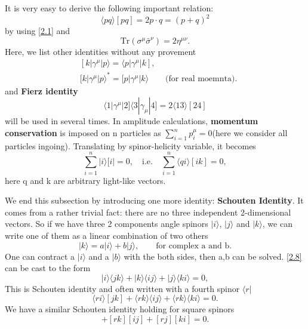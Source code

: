 \documentclass[12pt]{article}
\numberwithin{equation}{section}
\newcommand{\mdavg}[2]{\langle #1 \rangle\!\langle #2 \rangle}
\newcommand{\avg}[1]{\langle #1 \rangle}
\newcommand{\aket}[1]{|#1\rangle}
\newcommand{\cbrak}[2]{\avg{#1}\![#2]}
\begin{document}
It is very easy to derive the following important relation:
\begin{equation}
    \cbrak{pq}{pq}=2p\cdot q= (p+q)^2
    \label{2.7}
\end{equation}
by using \eqref{2.1} and 
\begin{equation*}
    \mathrm{Tr}(\sigma^\mu \bar{\sigma}^\nu)=2\eta^{\mu\nu}.
\end{equation*}
Here, we list other identities without any provement
\begin{align}
    &[k|\gamma^\mu\aket{p}=\langle p|\gamma^\mu |k],\\
    &{[k|\gamma^\mu\aket{p}}^*=[p|\gamma^\mu\aket{k} \qquad \text{(for real moemnta)}.
\end{align}
and \textbf{Fierz identity}
\begin{equation}
    \langle 1|\gamma^\mu |2]\langle 3|\gamma_\mu |4]=2\cbrak{13}{24}
\end{equation}
will be used in several times.
In amplitude calculations, \textbf{momentum conservation} is imposed on n particles as $\sum_{i=1}^{n}p_i^\mu=0$(here we consider all particles ingoing). Translating by 
spinor-helicity variable, it becomes
\begin{equation}
   \sum_{i=1}^{n}\aket{i}[i|=0,\quad \text{i.e.}\quad \sum_{i=1}^{n}\cbrak{qi}{ik}=0,
\end{equation}
here q and k are arbitrary light-like vectors.

We end this subsection by introducing one more identity: \textbf{Schouten Identity}. It comes from a rather trivial fact: there are no three independent 2-dimensional vectors. So if we have three 2 components angle spinors $\aket{i}$, $\aket{j}$ and $\aket{k}$, we can write one of them as a linear combination of two others
\begin{equation}
    \aket{k}=a\aket{i}+b\aket{j},\qquad \text{for complex a and b}.
    \label{2.8}
\end{equation} 
One can contract a $\aket{i}$ and a $\aket{b}$ with the both sides, then a,b can be solved. \eqref{2.8} can be cast to the form
\begin{equation}
    \aket{i}\avg{jk}+\aket{k}\avg{ij}+\aket{j}\avg{ki}=0,
\end{equation}
This is Schouten identity and often written with a fourth spinor $\langle r|$
\begin{equation}
    \cbrak{ri}{jk}+\mdavg{rk}{ij}+\mdavg{rk}{ki}=0.
\end{equation}
We have a similar Schouten identity holding for square spinors
\begin{equation}
    [ri][jk]+[rk][ij]+[rj][ki]=0.
\end{equation}
\end{document}
